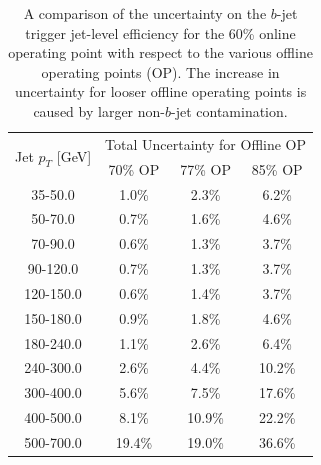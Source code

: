 \begin{table}[ht]
  \begin{center}
  \begin{tabular}{|c||c|c|c|}
    \hline
    \multirow{2}{*}{Jet $p_T$ [GeV]} &\multicolumn{3}{c|}{Total Uncertainty for Offline OP} \\ \cline{2-4} 

                & \hspace{1.5mm}70\% OP\hspace{1.5mm} & \hspace{1.5mm}77\% OP\hspace{1.5mm} & \hspace{1.5mm}85\% OP\hspace{1.5mm} \\
    \hline
    35-50.0   & 1.0\%   & 2.3\%   & 6.2\%  \\
    50-70.0   & 0.7\%   & 1.6\%   & 4.6\%  \\
    70-90.0   & 0.6\%   & 1.3\%   & 3.7\%  \\
    90-120.0  & 0.7\%   & 1.3\%   & 3.7\%  \\
    120-150.0 & 0.6\%   & 1.4\%   & 3.7\%  \\
    150-180.0 & 0.9\%   & 1.8\%   & 4.6\%  \\
    180-240.0 & 1.1\%   & 2.6\%   & 6.4\%  \\
    \hline          
    240-300.0 & 2.6\%   & 4.4\%   & 10.2\% \\
    300-400.0 & 5.6\%   & 7.5\%   & 17.6\% \\
    400-500.0 & 8.1\%   & 10.9\%  & 22.2\% \\
    500-700.0 & 19.4\%  & 19.0\%  & 36.6\% \\
    \hline
  \end{tabular}
  \vspace{10pt}
  \end{center}
    \vspace{-1.5em}
    \caption[A comparison of the uncertainty on the $b$-jet trigger jet-level efficiency
      for various offline operating points.]
            {
    A comparison of the uncertainty on the $b$-jet trigger jet-level efficiency
    for the 60\% online operating point with respect to the various offline operating points (OP).
    The increase in uncertainty for looser offline operating points is caused by larger non-$b$-jet contamination.
            }
  \label{tab:trig-bTrig_jetSys_opComp}
  \end{table}

